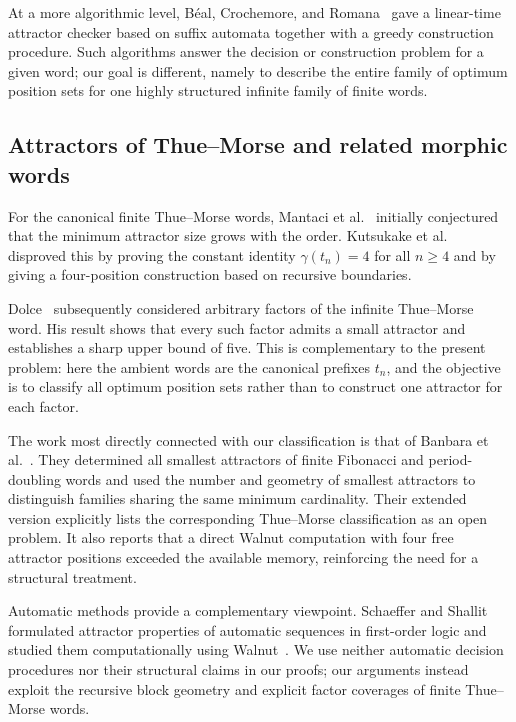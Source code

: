 \documentclass[10pt,a4paper]{article}
\theoremstyle{definition}\newtheorem{definition}[theorem]{Definition}
\theoremstyle{remark}\newtheorem{remark}[theorem]{Remark}
\begin{document}
At a more algorithmic level, B\'eal, Crochemore, and Romana~\cite{Beal2025} gave a linear-time attractor checker based on suffix automata together with a greedy construction procedure. Such algorithms answer the decision or construction problem for a given word; our goal is different, namely to describe the entire family of optimum position sets for one highly structured infinite family of finite words.

\subsection{Attractors of Thue--Morse and related morphic words}
For the canonical finite Thue--Morse words, Mantaci et al.~\cite{Mantaci2019} initially conjectured that the minimum attractor size grows with the order. Kutsukake et al.~\cite{Kutsukake2020} disproved this by proving the constant identity $\gamma(t_n)=4$ for all $n\ge4$ and by giving a four-position construction based on recursive boundaries.

Dolce~\cite{Dolce2023} subsequently considered arbitrary factors of the infinite Thue--Morse word. His result shows that every such factor admits a small attractor and establishes a sharp upper bound of five. This is complementary to the present problem: here the ambient words are the canonical prefixes $t_n$, and the objective is to classify all optimum position sets rather than to construct one attractor for each factor.

The work most directly connected with our classification is that of Banbara et al.~\cite{Banbara2026}. They determined all smallest attractors of finite Fibonacci and period-doubling words and used the number and geometry of smallest attractors to distinguish families sharing the same minimum cardinality. Their extended version explicitly lists the corresponding Thue--Morse classification as an open problem. It also reports that a direct Walnut computation with four free attractor positions exceeded the available memory, reinforcing the need for a structural treatment.

Automatic methods provide a complementary viewpoint. Schaeffer and Shallit~\cite{Schaeffer20} formulated attractor properties of automatic sequences in first-order logic and studied them computationally using Walnut~\cite{Mousavi2016}. We use neither automatic decision procedures nor their structural claims in our proofs; our arguments instead exploit the recursive block geometry and explicit factor coverages of finite Thue--Morse words.
\end{document}
